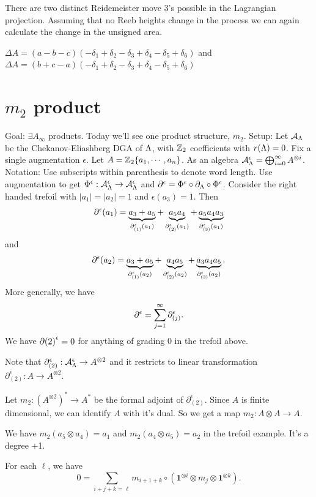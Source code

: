 \documentclass[11pt,oneside]{amsart}
\begin{document}
There are two distinct Reidemeister move 3's possible in the Lagrangian projection. Assuming that no Reeb heights change in the process we can again calculate the change in the unsigned area.

$\Delta A = (a-b-c)(-\delta_1+\delta_2-\delta_3+\delta_4-\delta_5+\delta_6)$ and
$\Delta A = (b+c-a)(-\delta_1+\delta_2-\delta_3+\delta_4-\delta_5+\delta_6)$


\section{$m_2$ product}
Goal: $\exists A_\infty$ products. Today we'll see one product structure, $m_2$. Setup: Let $\mathcal{A}_{\Lambda}$ be the Chekanov-Eliashberg DGA of $\Lambda$, with $\mathbb Z_2$ coefficients with $r(\Lambda)=0$. Fix a single augmentation $\epsilon$. Let $A=\mathbb Z_2\{ a_1,\cdots,a_n\}$. As an algebra $\mathcal{A}_{\Lambda}^\epsilon=\bigoplus_{i=0}^\infty A^{\otimes i}$. Notation: Use subscripts within parenthesis to denote word length. Use augmentation to get $\Phi^\epsilon:\mathcal{A}_{\Lambda}^\epsilon \rightarrow \mathcal{A}_{\Lambda}^\epsilon$ and $\partial^\epsilon = \Phi^\epsilon \circ \partial_\Lambda \circ \Phi^{\epsilon}$. Consider the right handed trefoil with $|a_1|=|a_2|=1$ and $\epsilon(a_3)=1$. Then
    \[\partial^\epsilon(a_1)=\underbrace{a_3+a_5}_{\partial^\epsilon_{(1)}(a_1)}+\underbrace{a_5a_4}_{\partial^\epsilon_{(2)}(a_1)}+\underbrace{a_5a_4a_3}_{\partial^\epsilon_{(3)}(a_1)}\]
and
    \[\partial^\epsilon(a_2)=\underbrace{a_3+a_5}_{\partial^\epsilon_{(1)}(a_2)}+\underbrace{a_4a_5}_{\partial^\epsilon_{(2)}(a_2)}+\underbrace{a_3a_4a_5}_{\partial^\epsilon_{(3)}(a_2)}.\]
More generally, we have
    \[\partial^\epsilon=\sum_{j=1}^\infty \partial_{(j)}^\epsilon.\]
We have $\partial{(2)}^\epsilon=0$ for anything of grading $0$ in the trefoil above.

Note that $\partial_{(2)}^\epsilon:\mathcal{A}_{\Lambda}^\epsilon \rightarrow A^{\otimes 2}$ and it restricts to linear transformation $\partial_{(2)}^\epsilon:A\rightarrow A^{\otimes 2}$.

\begin{definition}
    Let $m_2:(A^{\otimes 2})^*\rightarrow A^*$ be the formal adjoint of $\partial_{(2)}^\epsilon$. Since $A$ is finite dimensional, we can identify $A$ with it's dual. So we get a map $m_2:A\otimes A\rightarrow A$.
\end{definition}

We have $m_2(a_5\otimes a_4)=a_1$ and $m_2(a_4\otimes a_5)=a_2$ in the trefoil example. It's a degree +1.

\begin{proposition}
    For each $\ell$, we have
        \[0=\sum_{i+j+k=\ell} m_{i+1+k}\circ(\mathbf{1}^{\otimes i}\otimes m_j  \otimes \mathbf{1}^{\otimes k}).\]
\end{proposition}
\end{document}
